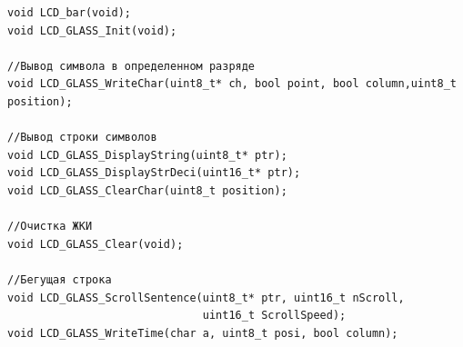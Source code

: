 \begin{verbatim}
void LCD_bar(void);
void LCD_GLASS_Init(void);

//Вывод символа в определенном разряде
void LCD_GLASS_WriteChar(uint8_t* ch, bool point, bool column,uint8_t position);

//Вывод строки символов
void LCD_GLASS_DisplayString(uint8_t* ptr);
void LCD_GLASS_DisplayStrDeci(uint16_t* ptr);
void LCD_GLASS_ClearChar(uint8_t position);

//Очистка ЖКИ
void LCD_GLASS_Clear(void);

//Бегущая строка
void LCD_GLASS_ScrollSentence(uint8_t* ptr, uint16_t nScroll, 
                              uint16_t ScrollSpeed);
void LCD_GLASS_WriteTime(char a, uint8_t posi, bool column);
\end{verbatim}